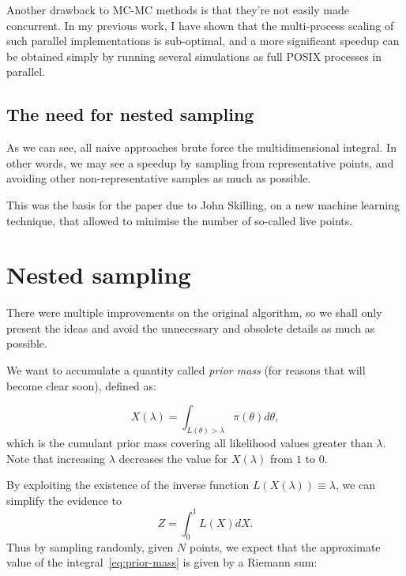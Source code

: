 \documentclass[12pt]{article}
\begin{document}
Another drawback to MC-MC methods is that they're not easily made
concurrent.\autocite{Metropolis-hastings-gibbs} In my previous work, I have
shown that the multi-process scaling of such parallel implementations is
sub-optimal, and a more significant speedup can be obtained simply by
running several simulations as full POSIX processes in parallel.\autocite{me-ising}

\subsection{The need for nested sampling}\label{sec-3-3}

As we can see, all naive approaches brute force the multidimensional
integral.  In other words, we may see a speedup by sampling from
representative points, and avoiding other non-representative samples
as much as possible.

This was the basis for the paper due to John
Skilling\autocite{skilling2006}, on a new machine learning technique, that
allowed to minimise the number of so-called live points.

\section{Nested sampling}\label{sec-4}

There were multiple
improvements\autocite{polychord,Feroz2009MultiNestAE,Higson2018DynamicNS}
on the original algorithm, so we shall only present the ideas and
avoid the unnecessary and obsolete details as much as possible.

We want to accumulate a quantity called \emph{prior mass} (for reasons that
will become clear soon), defined as:

\begin{equation}\label{eq:prior-mass}
X ( \lambda)  = \int_{L(\theta) > \lambda} \pi (\theta) d \theta,
\end{equation}
which is the cumulant prior mass covering all likelihood values
greater than \( \lambda \). Note that increasing \( \lambda \) decreases the value
for \( X( \lambda) \) from \(1\) to \(0\).

By exploiting the existence of the inverse function
\( L ( X ( \lambda) ) \equiv \lambda \), we can simplify the evidence to
\begin{equation}
Z = \int _0 ^1 L(X) dX.
\end{equation}
Thus by sampling randomly, given \(N\) points, we expect that the
approximate value of the integral~\eqref{eq:prior-mass} is given by a
Riemann sum:
\end{document}

